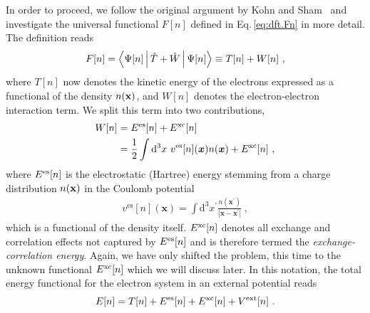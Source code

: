 In order to proceed, we follow the original argument by Kohn and Sham~ and investigate the universal functional $F[n]$ defined in Eq.\,\eqref{eq:dft.Fn} in more detail. The definition reads
\begin{align}
	F[n] 
		= \Braket{\Psi [n] | \hat T + \hat W | \Psi [n]}
		\equiv T[n] + W[n]~,
	\label{eq:dft.Fn.2}
\end{align}
where $T[n]$ now denotes the kinetic energy of the electrons expressed as a functional of the density $n ({\bf x})$, and $W[n]$ denotes the electron-electron interaction term. We split this term into two contributions,
\begin{align}
	\begin{split}
	W[n] 
		&= E^{\rm es} [n] + E^{\rm xc} [n] \\
		&= \frac{1}{2} \int \mathrm{d}^{3} x ~ 
			v^{\mathrm{es}}[n](\boldsymbol{x}) n(\boldsymbol{x})+E^{\mathrm{xc}}[n]~,
	\end{split}
	\label{eq:dft.KS.W}
\end{align}
where $E^{\rm es} [n]$ is the electrostatic (Hartree) energy stemming from a charge distribution $n ({\bf x})$ in the Coulomb potential
\begin{align}
	v^{\mathrm{es}}[n](\boldsymbol{x})
		= \int \mathrm{d}^{3} x^{\prime} \frac{n\left(\boldsymbol{x}^{\prime}\right)}{\left|\boldsymbol{x}-\boldsymbol{x}^{\prime}\right|}~,
	\label{eq:dft.KS.ves}
\end{align}
which is a functional of the density itself. $E^{\rm xc} [n]$ denotes all exchange and correlation effects not captured by $E^{\rm es} [n]$ and is therefore termed the \emph{exchange-correlation energy}. Again, we have only shifted the problem, this time to the unknown functional $E^{\rm xc} [n]$ which we will discuss later.
In this notation, the total energy functional for the electron system in an external potential reads
\begin{align}
	E[n]
		= T[n] +  E^{\rm es}[n] + E^{\rm xc} [n] + V^{\rm ext}[n]~.
	\label{eq:dft.Ks.En}
\end{align}

